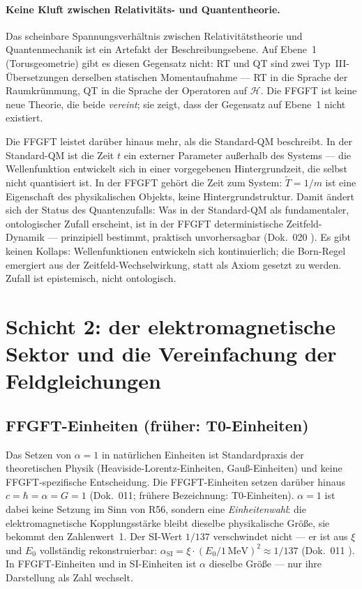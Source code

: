 \paragraph{Keine Kluft zwischen Relativitäts- und Quantentheorie.}
Das scheinbare Spannungsverhältnis zwischen Relativitätstheorie und
Quantenmechanik ist ein Artefakt der Beschreibungsebene. Auf Ebene~1
(Torusgeometrie) gibt es diesen Gegensatz nicht: RT und QT sind zwei
Typ~III-Übersetzungen derselben statischen Momentaufnahme ---
RT in die Sprache der Raumkrümmung, QT in die Sprache der Operatoren
auf $\mathcal{H}$. Die FFGFT ist keine neue Theorie, die beide
\emph{vereint}; sie zeigt, dass der Gegensatz auf Ebene~1 nicht existiert.

Die FFGFT leistet darüber hinaus mehr, als die Standard-QM beschreibt.
In der Standard-QM ist die Zeit $t$ ein externer Parameter außerhalb des
Systems --- die Wellenfunktion entwickelt sich in einer vorgegebenen
Hintergrundzeit, die selbst nicht quantisiert ist. In der FFGFT gehört
die Zeit zum System: $\tilde T=1/m$ ist eine Eigenschaft des physikalischen
Objekts, keine Hintergrundstruktur. Damit ändert sich der Status des
Quantenzufalls: Was in der Standard-QM als fundamentaler, ontologischer
Zufall erscheint, ist in der FFGFT deterministische Zeitfeld-Dynamik ---
prinzipiell bestimmt, praktisch unvorhersagbar (Dok.~020 \KM). Es gibt
keinen Kollaps: Wellenfunktionen entwickeln sich kontinuierlich; die
Born-Regel emergiert aus der Zeitfeld-Wechselwirkung, statt als Axiom
gesetzt zu werden. Zufall ist epistemisch, nicht ontologisch.

\section{Schicht 2: der elektromagnetische Sektor und die Vereinfachung der Feldgleichungen}

\subsection*{FFGFT-Einheiten (früher: T0-Einheiten)}

Das Setzen von $\alpha=1$ in natürlichen Einheiten ist Standardpraxis der
theoretischen Physik (Heaviside-Lorentz-Einheiten, Gauß-Einheiten) und keine
FFGFT-spezifische Entscheidung. Die FFGFT-Einheiten setzen darüber hinaus
$c=\hbar=\alpha=G=1$ (Dok.~011; frühere Bezeichnung: T0-Einheiten). $\alpha=1$
ist dabei keine Setzung im Sinn von R56, sondern eine \emph{Einheitenwahl}: die
elektromagnetische Kopplungsstärke bleibt dieselbe physikalische Größe, sie
bekommt den Zahlenwert~1. Der SI-Wert $1/137$ verschwindet nicht --- er ist
aus $\xi$ und $E_0$ vollständig rekonstruierbar:
$\alpha_{\mathrm{SI}}=\xi\cdot(E_0/1\,\mathrm{MeV})^2\approx1/137$ (Dok.~011
\KM). In FFGFT-Einheiten und in SI-Einheiten ist $\alpha$ dieselbe Größe ---
nur ihre Darstellung als Zahl wechselt.

